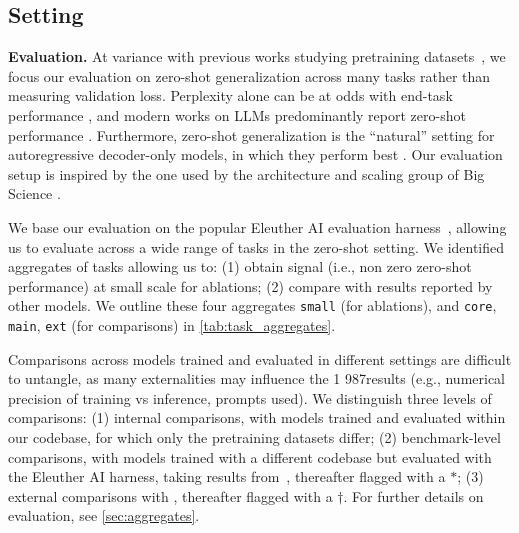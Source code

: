 \subsection{Setting}
\label{sec:exp_setting}

\textbf{Evaluation.} At variance with previous works studying pretraining datasets~\cite{gopher, lee2022deduplicating}, we focus our evaluation on zero-shot generalization across many tasks rather than measuring validation loss. Perplexity alone can be at odds with end-task performance \cite{tay2021scale}, and modern works on LLMs predominantly report zero-shot performance \cite{brown2020language, gopher, chowdhery2022palm}. Furthermore, zero-shot generalization is the ``natural'' setting for autoregressive decoder-only models, in which they perform best \cite{Wang2022WhatLM}. Our evaluation setup is inspired by the one used by the architecture and scaling group of Big Science \cite{scao2022language}.

We base our evaluation on the popular Eleuther AI evaluation harness~\cite{gao2021eval}, allowing us to evaluate across a wide range of tasks in the zero-shot setting. We identified aggregates of tasks allowing us to: (1) obtain signal (i.e., non zero zero-shot performance) at small scale for ablations; (2) compare with results reported by other models. We outline these four aggregates \texttt{small} (for ablations), and \texttt{core}, \texttt{main}, \texttt{ext} (for comparisons) in \ref{tab:task_aggregates}.

Comparisons across models trained and evaluated in different settings are difficult to untangle, as many externalities may influence the 1 987results (e.g., numerical precision of training vs inference, prompts used). We distinguish three levels of comparisons: (1) internal comparisons, with models trained and evaluated within our codebase, for which only the pretraining datasets differ; (2) benchmark-level comparisons, with models trained with a different codebase but evaluated with the Eleuther AI harness, taking results from~\citet{scao2022language, black2022gpt, alephalpha, dey2023cerebras}, thereafter flagged with a $*$; (3) external comparisons  with \citet{brown2020language, chowdhery2022palm}, thereafter flagged with a $\dagger$. For further details on evaluation, see \ref{sec:aggregates}. 

